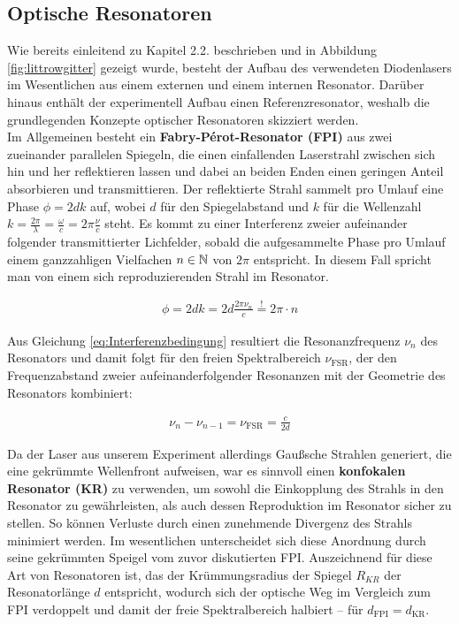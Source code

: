 \newpage
\subsection{Optische Resonatoren}
\noindent Wie bereits einleitend zu Kapitel 2.2. beschrieben und in Abbildung \ref{fig:littrowgitter} gezeigt wurde, besteht der Aufbau des verwendeten Diodenlasers im Wesentlichen aus einem externen und einem internen Resonator. Darüber hinaus enthält der experimentell Aufbau einen Referenzresonator, weshalb die grundlegenden Konzepte optischer Resonatoren skizziert werden. \\

\noindent Im Allgemeinen besteht ein \textbf{Fabry-Pérot-Resonator (FPI)} aus zwei zueinander parallelen Spiegeln, die einen einfallenden Laserstrahl zwischen sich hin und her reflektieren lassen und dabei an beiden Enden einen geringen Anteil absorbieren und transmittieren. Der reflektierte Strahl sammelt pro Umlauf eine Phase $\phi=2dk$ auf, wobei $d$ für den Spiegelabstand und $k$ für die Wellenzahl $k=\frac{2\pi}{\lambda}=\frac{\omega}{c}=2\pi\frac{\nu}{c}$ steht. Es kommt zu einer Interferenz zweier aufeinander folgender transmittierter Lichfelder, sobald die aufgesammelte Phase pro Umlauf einem ganzzahligen Vielfachen $n\in \mathbb{N}$ von $2\pi$ entspricht. In diesem Fall spricht man von einem sich reproduzierenden Strahl im Resonator.

\begin{align}
    \phi=2dk = 2d \frac{2\pi \nu_{n}}{c} \overset{!}{=} 2\pi \cdot n \label{eq:Interferenzbedingung}
\end{align}

\noindent Aus Gleichung \ref{eq:Interferenzbedingung} resultiert die Resonanzfrequenz $\nu_{n}$ des Resonators und damit folgt für den freien Spektralbereich $\nu_{\text{FSR}}$, der den Frequenzabstand zweier aufeinanderfolgender Resonanzen mit der Geometrie des Resonators kombiniert: 

\begin{align}
    \nu_{n}-\nu_{n-1}=\nu_{\text{FSR}}=\frac{c}{2d}
\end{align}


\noindent Da der Laser aus unserem Experiment allerdings Gaußsche Strahlen generiert, die eine gekrümmte Wellenfront aufweisen, war es sinnvoll einen \textbf{konfokalen Resonator (KR)} zu verwenden, um sowohl die Einkopplung des Strahls in den Resonator zu gewährleisten, als auch dessen Reproduktion im Resonator sicher zu stellen. So können Verluste durch einen zunehmende Divergenz des Strahls minimiert werden. Im wesentlichen unterscheidet sich diese Anordnung durch seine gekrümmten Speigel vom zuvor diskutierten FPI. Auszeichnend für diese Art von Resonatoren ist, das der Krümmungsradius der Spiegel $R_{KR}$ der Resonatorlänge $d$ entspricht, wodurch sich der optische Weg im Vergleich zum FPI verdoppelt und damit der freie Spektralbereich halbiert -- für $d_{\text{FPI}}=d_{\text{KR}}$.

